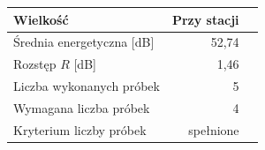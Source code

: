 \begin{tabular}{@{}lrr@{}}
\toprule
Wielkość & Przy stacji \\
\midrule
Średnia energetyczna [dB] & 52,74 \\
Rozstęp $R$ [dB] & 1,46  \\
Liczba wykonanych próbek & 5  \\
Wymagana liczba próbek & 4  \\
Kryterium liczby próbek & spełnione  \\
\bottomrule
\end{tabular}
